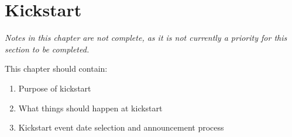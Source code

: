 \chapter{Kickstart}

\textit{Notes in this chapter are not complete, as it is not currently a priority for this section to be completed.}

This chapter should contain:
\begin{enumerate}
\item Purpose of kickstart
\item What things should happen at kickstart
\item Kickstart event date selection and announcement process
\end{enumerate}
